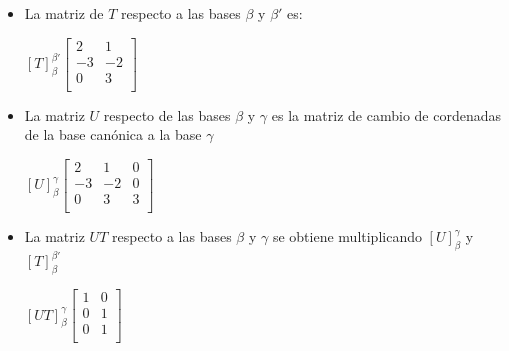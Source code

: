 \begin{itemize}
     \begin{itemize}
        \item La matriz de $T$ respecto a las bases $\beta$ y $\beta'$ es:
        \begin{center}
            $ \left[ T \right]_{\beta}^{\beta'}
            \begin{bmatrix}
                2  &  1 \\
               -3  & -2 \\
                0  &  3 \\
            \end{bmatrix}      
            $
        \end{center}
        \item  La matriz $U$ respecto de las bases $\beta$ y $\gamma$ es la matriz de cambio de cordenadas de la base canónica a la base $\gamma$
        \begin{center}
            $ \left[ U \right]_{\beta}^{\gamma}
            \begin{bmatrix}
                2  &  1  & 0 \\
               -3  & -2  & 0 \\
                0  &  3  & 3 \\
            \end{bmatrix}      
            $
        \end{center}

        \item La matriz $UT$ respecto a las bases $\beta$ y $\gamma$ se obtiene multiplicando $\left[ U \right]_{\beta}^{\gamma}$
                y $\left[ T \right]_{\beta}^{\beta'}$
        \begin{center}
            $ \left[ UT \right]_{\beta}^{\gamma}
            \begin{bmatrix}
                1  &  0 \\
                0  &  1 \\
                0  &  1 \\
            \end{bmatrix}      
            $
        \end{center}


\end{itemize}
\end{itemize}
